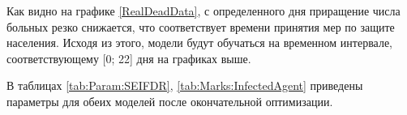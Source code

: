 Как видно на графике \ref{RealDeadData}, с определенного дня приращение числа больных резко снижается, что соответствует времени принятия мер по защите населения. Исходя из этого, модели будут обучаться на временном интервале, соответствующему  [0; 22] дня на графиках выше.

В таблицах \ref{tab:Param:SEIFDR}, \ref{tab:Marks:InfectedAgent}  приведены параметры для обеих моделей  после окончательной оптимизации.

\begin{table}[H]
	\renewcommand{\thetable}{\thesubsection.\arabic{table}}
\end{table}
